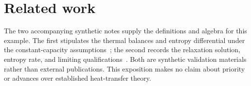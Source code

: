 \section{Related work}
The two accompanying synthetic notes supply the definitions and algebra for this example. The first stipulates the thermal balances and entropy differential under the constant-capacity assumptions~\cite{fixturemodel}; the second records the relaxation solution, entropy rate, and limiting qualifications~\cite{fixturealgebra}. Both are synthetic validation materials rather than external publications. This exposition makes no claim about priority or advances over established heat-transfer theory.
